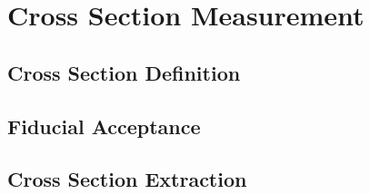 \section{Cross Section Measurement}
\subsection{Cross Section Definition}
\subsection{Fiducial Acceptance}
\subsection{Cross Section Extraction}
